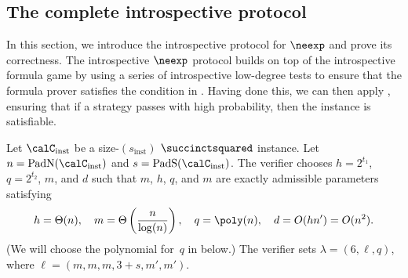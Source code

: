 \subsection{The complete introspective protocol}\label{sec:the-whole-banana}

In this section, we introduce the introspective protocol for $\neexp$ and prove its correctness.
The introspective $\neexp$ protocol builds on top of the introspective formula game
by using a series of introspective low-degree tests to ensure that the formula prover satisfies the condition in .
Having done this, we can then apply ,
ensuring that if a strategy passes with high probability, then the instance is satisfiable.

\begin{definition}\label{def:the-protocol-to-end-all-protocols}
Let $\calC_{\mathrm{inst}}$ be a size-$(s_{\mathrm{inst}})$ $\succinctsquared$ instance.
Let $n = \mathrm{PadN}(\calC_{\mathrm{inst}})$ and $s = \mathrm{PadS}(\calC_{\mathrm{inst}})$.
The verifier chooses $h = 2^{t_1}$, $q = 2^{t_2}$, $m$, and $d$
such that $m$, $h$, $q$, and $m$ are exactly admissible parameters satisfying
\begin{equation*}
h = \Theta(n),
\quad
m = \Theta\left(\frac{n}{\log(n)}\right),
\quad
q = \poly(n),
\quad
d = O(hn') = O(n^2).
\end{equation*}
(We will choose the polynomial for~$q$ in  below.)
The verifier sets $\lambda = (6, \ell, q)$,
where $\ell = (m,m,m, 3 + s, m', m')$.


\end{definition}
